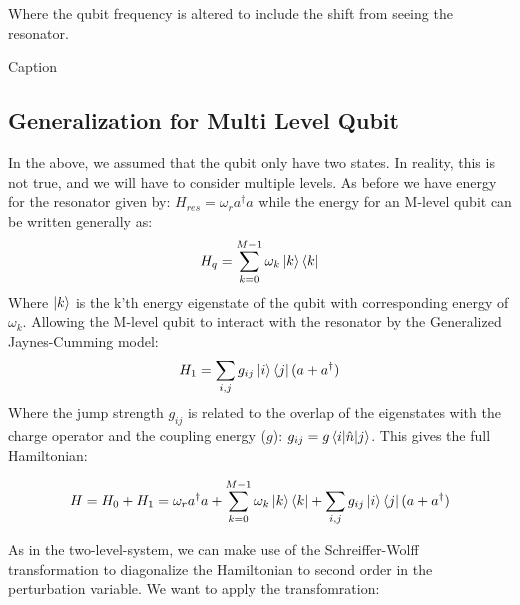 Where the qubit frequency is altered to include the shift from seeing the resonator.
\begin{marginfigure}
    \centering
    \caption{Caption}
    \label{fig:dispersive_two_level_qubit}
\end{marginfigure}

\subsection{Generalization for Multi Level Qubit}
In the above, we assumed that the qubit only have two states. In reality, this is not true, and we will have to consider multiple levels. As before we have energy for the resonator given by: $H_{res} = \omega_r a^\dagger a$ while the energy for an M-level qubit can be written generally as:
\begin{equation}
    H_{q} = \sum_{k = 0}^{M-1} \omega_k \ket{k}\bra{k}
\end{equation}
Where $\ket{k}$ is the k'th energy eigenstate of the qubit with corresponding energy of $\omega_k$. Allowing the M-level qubit to interact with the resonator by the Generalized Jaynes-Cumming model:
\begin{equation}
    H_1 =  \sum_{i,j} g_{ij} \ket{i}\bra{j} (a + a^\dagger ) 
\end{equation}
Where the jump strength $g_{ij}$ is related to the overlap of the eigenstates with the charge operator and the coupling energy ($g$): $g_{ij} = g \matrixel{i}{\hat{n}}{j}$. This gives the full Hamiltonian: 
\begin{fullwidth}
    \begin{equation}
        H = H_0 + H_1  = \omega_r a^\dagger a +  \sum_{k = 0}^{M-1} \omega_k \ket{k}\bra{k} + \sum_{i,j} g_{ij} \ket{i}\bra{j} (a + a^\dagger ) 
    \end{equation}
\end{fullwidth}
As in the two-level-system, we can make  use of the Schreiffer-Wolff transformation to diagonalize the Hamiltonian to second order in the perturbation variable. We want to apply the transfomration: 
